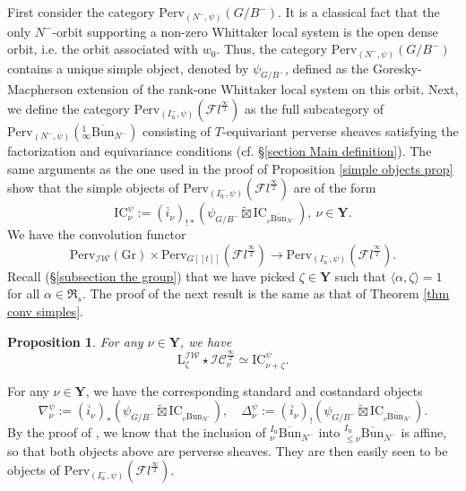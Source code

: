 \documentclass[11pt]{amsart}
\theoremstyle{plain}
\newtheorem{prop}[thm]{Proposition}
\theoremstyle{remark}
\numberwithin{equation}{section}
\begin{document}
	First consider the category $\mathrm{Perv}_{(N^-,\psi)}(G/B^-)$. It is a classical fact that the only $N^-$-orbit supporting a non-zero Whittaker local system is the open dense orbit, i.e. the orbit associated with $w_0$. Thus, the category $\mathrm{Perv}_{(N^-,\psi)}(G/B^-)$ contains a unique simple object, denoted by $\psi_{G/B^-}$, defined as the Goresky-Macpherson extension of the rank-one Whittaker local system on this orbit. Next, we define the category $\mathrm{Perv}_{(I^-_\mathrm{u},\psi)}(\mathcal{F}l^{\frac{\infty}{2}})$ as the full subcategory of $\mathrm{Perv}_{(N^-,\psi)}({_\infty^1\overline{\mathrm{Bun}}_{N^-}})$ consisting of $T$-equivariant perverse sheaves satisfying the factorization and equivariance conditions (cf. §\ref{section Main definition}). The same arguments as the one used in the proof of Proposition \ref{simple objects prop} show that the simple objects of $\mathrm{Perv}_{(I^-_\mathrm{u},\psi)}(\mathcal{F}l^{\frac{\infty}{2}})$ are of the form
	$$\mathrm{IC}_\nu^\psi:=(\overline{i}_\nu)_{!*}\left(\psi_{G/B^-}\widetilde{\boxtimes}\mathrm{IC}_{{_\nu\overline{\mathrm{Bun}}_{N^-}}}\right),~\nu\in\mathbf{Y}. $$
	We have the convolution functor
	$$\mathrm{Perv}_{\mathcal{IW}}(\mathrm{Gr})\times \mathrm{Perv}_{G[[t]]}(\mathcal{F}l^{\frac{\infty}{2}})\to  \mathrm{Perv}_{(I^-_\mathrm{u},\psi)}(\mathcal{F}l^{\frac{\infty}{2}}).$$
Recall (§\ref{subsection the group}) that we have picked $\zeta\in\mathbf{Y}$ such that $\langle\alpha,\zeta\rangle=1$ for all $\alpha\in\mathfrak{R}_s$. The proof of the next result is the same as that of Theorem \ref{thm conv simples}.
	\begin{prop}{{\cite[Theorem 5.3.5]{ABBGM}}}\label{conv whitt}
		For any $\nu\in\mathbf{Y}$, we have
		$$\mathrm{L}^\mathcal{IW}_{\zeta}\star\mathcal{IC}^{\frac{\infty}{2}}_\nu\simeq  \mathrm{IC}^\psi_{\nu+\zeta}.$$
	\end{prop}
	For any $\nu\in\mathbf{Y}$, we have the corresponding standard and costandard objects
	$$\nabla_\nu^\psi:= (\overline{i}_\nu)_{*}\left(\psi_{G/B^-}\widetilde{\boxtimes}\mathrm{IC}_{{_\nu\overline{\mathrm{Bun}}_{N^-}}}\right),\quad  \Delta_\nu^\psi:= (\overline{i}_\nu)_{!}\left(\psi_{G/B^-}\widetilde{\boxtimes}\mathrm{IC}_{{_\nu\overline{\mathrm{Bun}}_{N^-}}}\right).$$
	By the proof of \cite[Corollary 4.4.5]{ABBGM}, we know that the inclusion of ${_{\nu}^{I_\mathrm{u}}\overline{\mathrm{Bun}}_{N^-}}$ into ${_{\leq\nu}^{I_\mathrm{u}}\overline{\mathrm{Bun}}_{N^-}}$ is affine, so that both objects above are perverse sheaves. They are then easily seen to be objects of $\mathrm{Perv}_{(I^-_\mathrm{u},\psi)}(\mathcal{F}l^{\frac{\infty}{2}})$.
\end{document}
